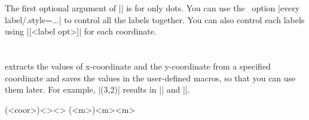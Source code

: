 \begin{tzcode}{.3}
\end{tzcode}

\remark
The first optional argument of |\tzcoorsquick*| is for only dots.
You can use the \Tikz\ option |every label/.style={...}| to control all the labels together.
You can also control each labels using |[<label opt>]| for each coordinate.

\begin{tzcode}{.3}
{}
\end{tzcode}


\section{\protect\cmd{\tzgetxyval}}
\label{s:tzgetxyval}

\icmd{\tzgetxyval} extracts the values of x-coordinate and the y-coordinate  from a specified coordinate and saves the values in the user-defined macros, so that you can use them later.
For example, |\tzgetxyval(3,2){\xval}{\yval}| results in || and ||.

\begin{tzdef}{}
\tzgetxyval(<coor>){<\macroXval>}{<\macroYval>}
(<m>){<m>}{<m>}
\end{tzdef}

\begin{tzcode}{.3}
\end{tzcode}


